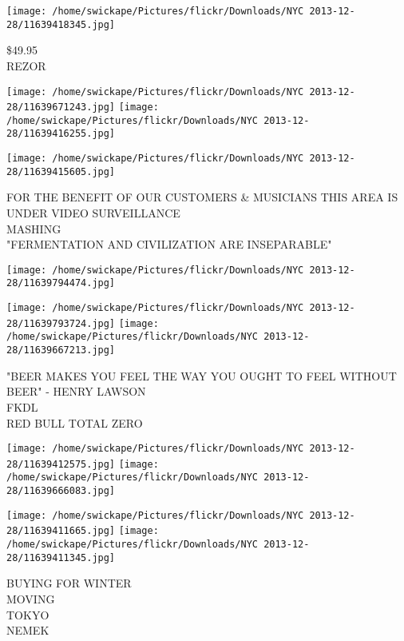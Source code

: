 \documentclass[10pt,letterpaper]{article}
\begin{document}
\vspace{0.25in}
\texttt{[image: /home/swickape/Pictures/flickr/Downloads/NYC 2013-12-28/11639418345.jpg]}

\$49.95\\
REZOR\\
\pagebreak

\texttt{[image: /home/swickape/Pictures/flickr/Downloads/NYC 2013-12-28/11639671243.jpg]}
\texttt{[image: /home/swickape/Pictures/flickr/Downloads/NYC 2013-12-28/11639416255.jpg]}

\vspace{0.25in}
\texttt{[image: /home/swickape/Pictures/flickr/Downloads/NYC 2013-12-28/11639415605.jpg]}

FOR THE BENEFIT OF OUR CUSTOMERS \& MUSICIANS THIS AREA IS UNDER VIDEO SURVEILLANCE\\
MASHING\\
"FERMENTATION AND CIVILIZATION ARE INSEPARABLE"\\
\pagebreak

\texttt{[image: /home/swickape/Pictures/flickr/Downloads/NYC 2013-12-28/11639794474.jpg]}

\vspace{0.25in}
\texttt{[image: /home/swickape/Pictures/flickr/Downloads/NYC 2013-12-28/11639793724.jpg]}
\texttt{[image: /home/swickape/Pictures/flickr/Downloads/NYC 2013-12-28/11639667213.jpg]}

"BEER MAKES YOU FEEL THE WAY YOU OUGHT TO FEEL WITHOUT BEER" {-} HENRY LAWSON\\
FKDL\\
RED BULL TOTAL ZERO\\
\pagebreak

\texttt{[image: /home/swickape/Pictures/flickr/Downloads/NYC 2013-12-28/11639412575.jpg]}
\texttt{[image: /home/swickape/Pictures/flickr/Downloads/NYC 2013-12-28/11639666083.jpg]}

\texttt{[image: /home/swickape/Pictures/flickr/Downloads/NYC 2013-12-28/11639411665.jpg]}
\texttt{[image: /home/swickape/Pictures/flickr/Downloads/NYC 2013-12-28/11639411345.jpg]}

BUYING FOR WINTER\\
MOVING\\
TOKYO\\
NEMEK\\
\pagebreak
\end{document}
